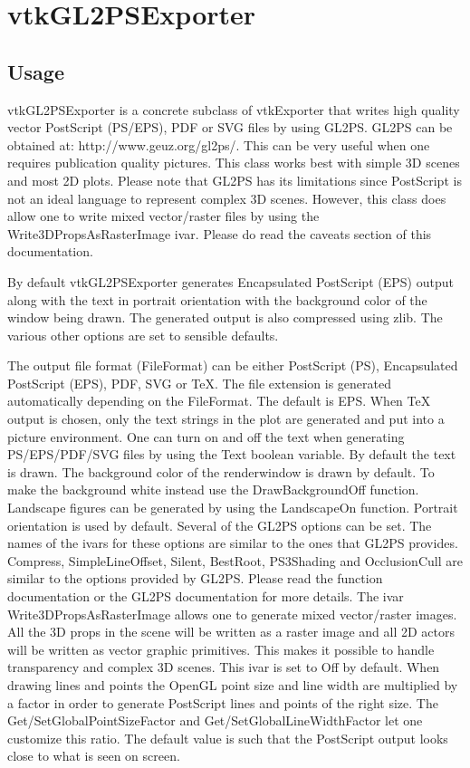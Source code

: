 \section{vtkGL2PSExporter}

\subsection{Usage}

 vtkGL2PSExporter is a concrete subclass of vtkExporter that writes
 high quality vector PostScript (PS/EPS), PDF or SVG files by using
 GL2PS.  GL2PS can be obtained at: http://www.geuz.org/gl2ps/.  This
 can be very useful when one requires publication quality pictures.
 This class works best with simple 3D scenes and most 2D plots.
 Please note that GL2PS has its limitations since PostScript is not
 an ideal language to represent complex 3D scenes.  However, this
 class does allow one to write mixed vector/raster files by using
 the Write3DPropsAsRasterImage ivar.  Please do read the caveats
 section of this documentation.

 By default vtkGL2PSExporter generates Encapsulated PostScript (EPS)
 output along with the text in portrait orientation with the
 background color of the window being drawn.  The generated output
 is also compressed using zlib. The various other options are set to
 sensible defaults.

 The output file format (FileFormat) can be either PostScript (PS),
 Encapsulated PostScript (EPS), PDF, SVG or TeX.  The file extension
 is generated automatically depending on the FileFormat.  The
 default is EPS.  When TeX output is chosen, only the text strings
 in the plot are generated and put into a picture environment.  One
 can turn on and off the text when generating PS/EPS/PDF/SVG files
 by using the Text boolean variable.  By default the text is drawn.
 The background color of the renderwindow is drawn by default.  To
 make the background white instead use the DrawBackgroundOff
 function.  Landscape figures can be generated by using the
 LandscapeOn function.  Portrait orientation is used by default.
 Several of the GL2PS options can be set.  The names of the ivars
 for these options are similar to the ones that GL2PS provides.
 Compress, SimpleLineOffset, Silent, BestRoot, PS3Shading and
 OcclusionCull are similar to the options provided by GL2PS.  Please
 read the function documentation or the GL2PS documentation for more
 details.  The ivar Write3DPropsAsRasterImage allows one to generate
 mixed vector/raster images.  All the 3D props in the scene will be
 written as a raster image and all 2D actors will be written as
 vector graphic primitives.  This makes it possible to handle
 transparency and complex 3D scenes.  This ivar is set to Off by
 default.  When drawing lines and points the OpenGL point size and
 line width are multiplied by a factor in order to generate
 PostScript lines and points of the right size.  The
 Get/SetGlobalPointSizeFactor and Get/SetGlobalLineWidthFactor let
 one customize this ratio.  The default value is such that the
 PostScript output looks close to what is seen on screen.

